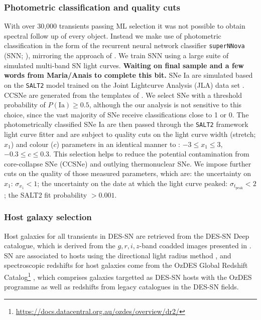 \documentclass[fleqn,usenatbib]{mnras}
\begin{document}
\subsubsection{Photometric classification and quality cuts \label{subsubsec:sn_classify}}
With over 30,000 transients passing ML selection it was not possible to obtain spectral follow up of every object. Instead we make use of photometric classification in the form of the recurrent neural network classifier \texttt{superNNova} (SNN; \citealt{Moller2019}), mirroring the approach of \citet{Scolnic2020}. We train SNN using a large suite of simulated multi-band SN light curves. \textbf{Waiting on final sample and a few words from Maria/Anais to complete this bit.} SNe Ia are simulated based on the \texttt{SALT2} model \citep{Guy2007} trained on the Joint Lightcurve Analysis (JLA) data set \citep{Betoule2014}. CCSNe are generated from the templates of \citet{Vincenzi2019}. We select SNe with a threshold probability of $P(\mathrm{Ia})\geq0.5$, although the our analysis is not sensitive to this choice, since the vast majority of SNe receive classifications close to 1 or 0. The photometrically classified SNe Ia are then passed through the \texttt{SALT2} framework light curve fitter and are subject to quality cuts on the light curve width (stretch; $x_1$) and colour ($c$) parameters in an identical manner to \citet{Vincenzi2020}: $-3 \leq x_1 \leq 3$, $-0.3 \leq c \leq 0.3$. This selection helps to reduce the potential contamination from core-collapse SNe (CCSNe) and outlying thermonuclear SNe. We impose further cuts on the quality of those measured parameters, which are: the uncertainty on $x_1$: $\sigma_{x_1} <1$; the uncertainty on the date at which the light curve peaked: $\sigma_{t_{\mathrm{peak}}} <2$; the SALT2 fit probability $>0.001$.  

\subsubsection{Host galaxy selection \label{subsubsec:sn_hosts}}
Host galaxies for all transients in DES-SN are retrieved from the DES-SN Deep catalogue, which is derived from the $g, r, i, z$-band coadded images presented in \citet{Wiseman2020}. SN are associated to hosts using the directional light radius method \citep[e.g.][]{Sullivan2006,Gupta2016}, and spectroscopic redshifts for host galaxies come from the OzDES Global Redshift Catalog\footnote{\url{https://docs.datacentral.org.au/ozdes/overview/dr2/}} \citep{Yuan2015,Childress2017,Lidman2020}, which comprises galaxies targetted as DES-SN hosts with the OzDES programme as well as redshifts from legacy catalogues in the DES-SN fields.
\end{document}
